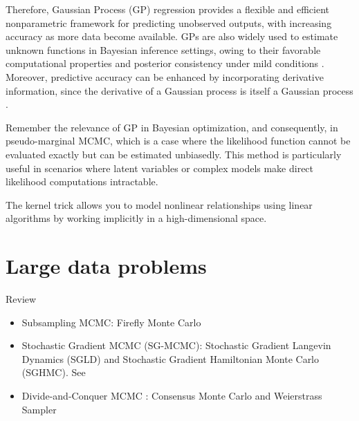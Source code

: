 Therefore, Gaussian Process (GP) regression provides a flexible and efficient nonparametric framework for predicting unobserved outputs, with increasing accuracy as more data become available. GPs are also widely used to estimate unknown functions in Bayesian inference settings, owing to their favorable computational properties and posterior consistency under mild conditions \cite{choi2007posterior, stuart2018posterior}. Moreover, predictive accuracy can be enhanced by incorporating derivative information, since the derivative of a Gaussian process is itself a Gaussian process \cite{solak2003derivative}.

Remember the relevance of GP in Bayesian optimization, and consequently, in pseudo-marginal MCMC, which is a case where the likelihood function cannot be evaluated exactly but can be estimated unbiasedly. This method is particularly useful in scenarios where latent variables or complex models make direct likelihood computations intractable.

The kernel trick allows you to model nonlinear relationships using linear algorithms by working implicitly in a high-dimensional space.

\section{Large data problems}\label{13_5}
Review \cite{bardenet2017markov}
\begin{itemize}
	\item Subsampling MCMC: Firefly Monte Carlo \cite{Maclaurin2015}
	\item Stochastic Gradient MCMC (SG-MCMC): Stochastic Gradient Langevin Dynamics (SGLD) and Stochastic Gradient Hamiltonian Monte Carlo (SGHMC). See \cite{nemeth2021stochastic,song2020extended,baker2019sgmcmc,chen2014stochastic,welling2011bayesian}
	\item Divide-and-Conquer MCMC \cite{quiroz2018subsampling,quiroz2019speeding}: Consensus Monte Carlo \cite{rendell2020global,scott2022bayes} and Weierstrass Sampler \cite{wu2017average}
\end{itemize}

